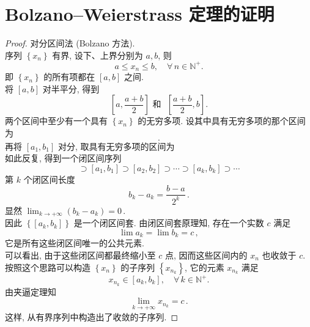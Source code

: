 \documentclass{book}
\newcommand{\Any}{\forall\,}
\newcommand{\set}[1]{\left\{#1\right\}}
\newcommand{\N}{\mathbb{N}}
\renewcommand{\le}{\leqslant}
\numberwithin{equation}{section}
\numberwithin{figure}{section}
\theoremstyle{definition}
\begin{document}
\section{Bolzano--Weierstrass 定理的证明}
\label{proof:BolzanoWeierstrass}
\begin{proof}
  对分区间法 (Bolzano 方法).\\
  序列 $\set{x_n}$ 有界, 设下、上界分别为 $a,b$, 则
  \begin{equation*}
    a\le x_n\le b,\quad \Any n\in\N^+.
  \end{equation*}
  即 $\set{x_n}$ 的所有项都在 $[a,b]$ 之间.\\
  将 $[a,b]$ 对半平分, 得到
  \begin{equation*}
    \left[ a,\frac{a+b}{2} \right] \text{ 和{} } \left[ \frac{a+b}{2},b \right].
  \end{equation*}
  两个区间中至少有一个具有 $\set{x_n}$ 的无穷多项. 设其中具有无穷多项的那个区间为
  \begin{equation*}
    [a_1,b_1].
  \end{equation*}
  再将 $[a_1,b_1]$ 对分, 取具有无穷多项的区间为
  \begin{equation*}
    [a_2,b_2]
  \end{equation*}
  如此反复, 得到一个闭区间序列
  \begin{equation*}
    [a,b]\supset[a_1,b_1]\supset[a_2,b_2]\supset\cdots\supset[a_k,b_k]\supset\cdots
  \end{equation*}
  第 $k$ 个闭区间长度
  \begin{equation*}
    b_k-a_k=\frac{b-a}{2^k}\,.
  \end{equation*}
  显然 $\lim_{k\to +\infty}(b_k-a_k)=0$\,.\\
  因此 $\set{[a_k,b_k]}$ 是一个闭区间套. 由闭区间套原理知, 存在一个实数 $c$ 满足
  \begin{equation*}
    \lim a_k=\lim b_k=c\,,
  \end{equation*}
  它是所有这些闭区间唯一的公共元素.\\
  可以看出, 由于这些闭区间都最终缩小至 $c$ 点, 因而这些区间内的 $x_n$ 也收敛于 $c$. 按照这个思路可以构造 $\set{x_n}$ 的子序列 $\set{x_{n_k}}$, 它的元素 $x_{n_k}$ 满足
  \begin{equation*}
    x_{n_k} \in [a_k,b_k],\quad\Any k\in\N^+.
  \end{equation*}
  由夹逼定理知
  \begin{equation*}
    \lim_{k\to+\infty}x_{n_k}=c\,.
  \end{equation*}
  这样, 从有界序列中构造出了收敛的子序列.
\end{proof}
\end{document}

